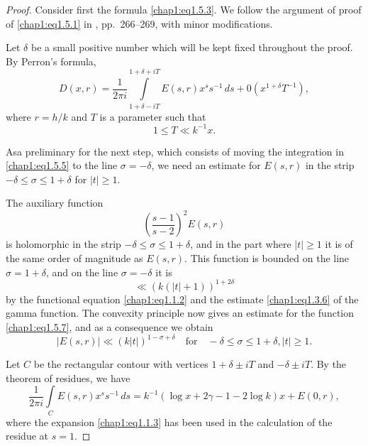 \begin{proof}
Consider first the formula \eqref{chap1:eq1.5.3}. We follow the
argument of proof of \eqref{chap1:eq1.5.1} in \cite{key27},
pp.~266--269, with minor modifications. 

Let $\delta$ be a small positive number which will be kept fixed
throughout the proof. By Perron's formula,
\begin{equation}\label{chap1:eq1.5.5}
D(x,r)=\frac{1}{2\pi i}\int\limits_{1+\delta-iT}^{1+\delta+iT}
E(s,r)x^s s^{-1}\,ds+0(x^{1+\delta} T^{-1}),
\end{equation}
where $r=h/k$ and $T$ is a parameter such that 
\begin{equation}\label{chap1:eq1.5.6}
1\leq T\ll k^{-1}x.
\end{equation}

As\pageoriginale a preliminary for the next step, which consists of
moving the integration in \eqref{chap1:eq1.5.5} to the line $\sigma=
-\delta$, we need an estimate for $E(s,r)$ in the strip $-\delta\leq
\sigma \leq 1+\delta$ for $|t|\geq 1$.

The auxiliary function 
\begin{equation}\label{chap1:eq1.5.7}
\left(\frac{s-1}{s-2}\right)^2E(s,r)
\end{equation}
is holomorphic in the strip $-\delta\leq\sigma\leq 1+\delta$, and in
the part where $|t|\geq 1$ it is of the same order of magnitude as
$E(s,r)$. This function is bounded on the line $\sigma=1+\delta$, and
on the line $\sigma=-\delta$ it is 
$$
\ll (k(|t|+1))^{1+2\delta}
$$
by the functional equation \eqref{chap1:eq1.1.2} and the estimate
\eqref{chap1:eq1.3.6} of the gamma function. The convexity principle
now gives an estimate for the function \eqref{chap1:eq1.5.7}, and as a
consequence we obtain
\begin{equation}\label{chap1:eq1.5.8}
|E(s,r)|\ll(k|t|)^{1-\sigma+\delta}\quad\text{for}\quad -\delta\leq
\sigma \leq 1+\delta, |t|\geq 1.
\end{equation}

Let $C$ be the rectangular contour with vertices $1+\delta\pm iT$ and
$-\delta\pm iT$. By the theorem of residues, we have 
\begin{equation}\label{chap1:eq1.5.9}
\frac{1}{2\pi i}\int\limits_C E(s,r)x^ss^{-1}\,ds=k^{-1}(\log
x+2\gamma-1-2 \log k)x+E(0,r),
\end{equation}
where the expansion \eqref{chap1:eq1.1.3} has been used in the
calculation of the residue at $s=1$.


\end{proof}
